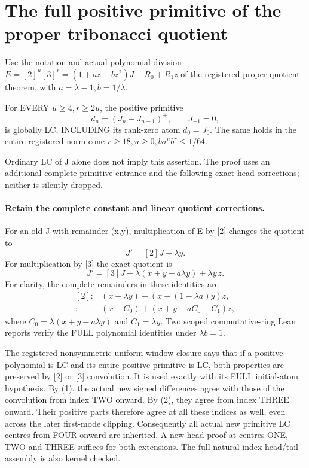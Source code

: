 \section{The full positive primitive of the proper tribonacci quotient}
Use the notation and actual polynomial division
$E=[2]^u[3]^r=(1+az+bz^2)J+R_0+R_1z$ of the registered
proper-quotient theorem, with $a=\lambda-1,b=1/\lambda$.
\begin{theorem}
For EVERY $u\ge4,r\ge2u$, the positive primitive
\[
       d_n=(J_n-J_{n-1})^+,\qquad J_{-1}=0,
\]
is globally LC, INCLUDING its rank-zero atom $d_0=J_0$.
The same holds in the entire registered norm cone
$r\ge18,u\ge0,b\sigma^u b^r\le1/64$.
\end{theorem}
Ordinary LC of J alone does not imply this assertion. The proof
uses an additional complete primitive entrance and the following
exact head corrections; neither is silently dropped.

\paragraph{Retain the complete constant and linear quotient corrections.}
For an old J with remainder (x,y), multiplication of E by [2]
changes the quotient to
\[
                         J'=[2]J+\lambda y.              \tag{1}
\]
For multiplication by [3] the exact quotient is
\[
 J'=[3]J+\lambda(x+y-a\lambda y)+\lambda y\,z.           \tag{2}
\]
For clarity, the complete remainders in these identities are
\[
 \begin{array}{ll}
 [2]:&(x-\lambda y)+(x+(1-\lambda a)y)z,\\
 [3]:&(x-C_0)+(x+y-aC_0-C_1)z,
 \end{array}
\]
where $C_0=\lambda(x+y-a\lambda y)$ and $C_1=\lambda y$.
Two scoped commutative-ring Lean reports verify the FULL
polynomial identities under $\lambda b=1$.

The registered nonsymmetric uniform-window closure says that
if a positive polynomial is LC and its entire positive primitive
is LC, both properties are preserved by [2] or [3] convolution.
It is used exactly with its FULL initial-atom hypothesis.
By (1), the actual new signed differences agree with those of
the convolution from index TWO onward. By (2), they agree from
index THREE onward. Their positive parts therefore agree at all
these indices as well, even across the later first-mode clipping.
Consequently all actual new primitive LC centres from FOUR onward
are inherited. A new head proof at centres ONE, TWO and THREE
suffices for both extensions. The full natural-index head/tail
assembly is also kernel checked.

